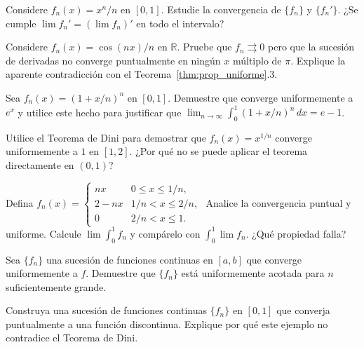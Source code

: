 \begin{prob}Considere $f_n(x) = x^n/n$ en $[0,1]$. Estudie la
          convergencia de $\{f_n\}$ y $\{f_n'\}$. ¿Se cumple
          $\lim f_n' = (\lim f_n)'$ en todo el intervalo?
\end{prob}

\begin{prob} Considere $f_n(x) = \cos(nx)/n$ en $\mathbb{R}$. Pruebe que
          $f_n \rightrightarrows 0$ pero que la sucesión de derivadas
          no converge puntualmente en ningún $x$ múltiplo de $\pi$.
          Explique la aparente contradicción con el
          Teorema~\ref{thm:prop_uniforme}.3.
\end{prob}

\begin{prob}Sea $f_n(x) = (1 + x/n)^n$ en $[0,1]$. Demuestre que
          converge uniformemente a $e^x$ y utilice este hecho para
          justificar que
          $\lim_{n\to\infty} \int_0^1 (1 + x/n)^n\,dx = e - 1$.

\end{prob}

\begin{prob}Utilice el Teorema de Dini para demostrar que
          $f_n(x) = x^{1/n}$ converge uniformemente a $1$ en $[1,2]$.
          ¿Por qué no se puede aplicar el teorema directamente en
          $(0,1)$?
\end{prob}


\begin{prob}Defina
          $f_n(x) = \begin{cases}
              nx     & 0 \leq x \leq 1/n,  \\
              2-nx   & 1/n < x \leq 2/n,   \\
              0      & 2/n < x \leq 1.
          \end{cases}$
          Analice la convergencia puntual y uniforme. Calcule
          $\lim \int_0^1 f_n$ y compárelo con $\int_0^1 \lim f_n$.
          ¿Qué propiedad falla?
\end{prob}

\begin{prob} Sea $\{f_n\}$ una sucesión de funciones continuas en $[a,b]$
          que converge uniformemente a $f$. Demuestre que $\{f_n\}$
          está uniformemente acotada para $n$ suficientemente grande.
\end{prob}

\begin{prob}Construya una sucesión de funciones continuas $\{f_n\}$ en
          $[0,1]$ que converja puntualmente a una función discontinua.
          Explique por qué este ejemplo no contradice el Teorema de
          Dini.
\end{prob}

